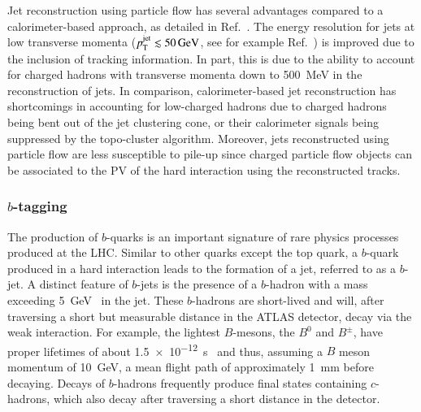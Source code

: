 Jet reconstruction using particle flow has several advantages compared to a
calorimeter-based approach, as detailed in Ref.~\cite{PERF-2015-09}. The energy
resolution for jets at low transverse momenta
($p_{\text{T}}^{\text{jet}} \lesssim \SI{50}{\ensuremath{\text{GeV}}}$, see for example
Ref.~\cite{JETM-2018-05}) is improved due to the inclusion of tracking
information. In part, this is due to the ability to account for charged hadrons
with transverse momenta down to \SI{500}{\MeV} in the reconstruction of jets. In
comparison, calorimeter-based jet reconstruction has shortcomings in accounting
for low-\pT charged hadrons due to charged hadrons being bent out of the jet
clustering cone, or their calorimeter signals being suppressed by the
topo-cluster algorithm. Moreover, jets reconstructed using particle flow are
less susceptible to pile-up since charged particle flow objects can be
associated to the PV of the hard interaction using the reconstructed tracks.


\subsubsection{$b$-tagging}

The production of $b$-quarks is an important signature of rare physics processes
produced at the LHC. Similar to other quarks except the top quark, a $b$-quark
produced in a hard interaction leads to the formation of a jet, referred to as a
$b$-jet. A distinct feature of $b$-jets is the presence of a $b$-hadron with a
mass exceeding \SI{5}{\GeV}~\cite{pdg2020} in the jet. These $b$-hadrons are
short-lived and will, after traversing a short but measurable distance in the
ATLAS detector, decay via the weak interaction. For example, the lightest
$B$-mesons, the $B^0$ and $B^\pm$, have proper lifetimes of about
\SI{1.5e-12}{\second}~\cite{pdg2020} and thus, assuming a $B$ meson momentum of
\SI{10}{\GeV}, a mean flight path of approximately \SI{1}{\milli\metre} before
decaying. Decays of $b$-hadrons frequently produce final states containing
$c$-hadrons, which also decay after traversing a short distance in the detector.

